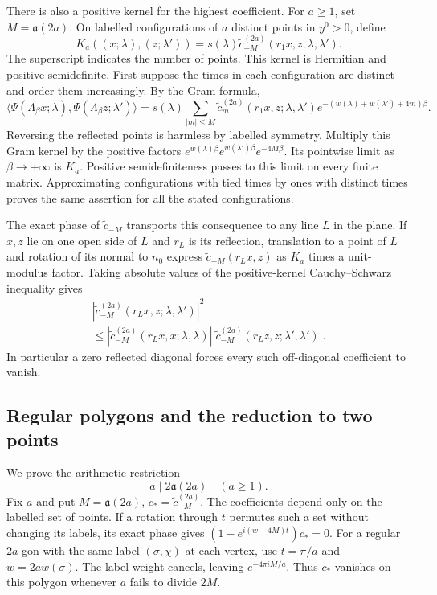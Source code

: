 There is also a positive kernel for the highest coefficient.
For $a\ge1$, set $M=\mathfrak a(2a)$. On labelled configurations
of $a$ distinct points in $y^0>0$, define
\begin{equation}\label{eq:rotation-top-coefficient-kernel}
 K_a((x;\lambda),(z;\lambda'))=
       s(\lambda)\widetilde c_{-M}^{(2a)}
                        (r_1x,z;\lambda,\lambda').
\end{equation}
The superscript indicates the number of points.
This kernel is Hermitian and positive semidefinite.
First suppose the times in each configuration are distinct and
order them increasingly. By the Gram formula,
\[
 \langle\Psi(\Lambda_\beta x;\lambda),
                 \Psi(\Lambda_\beta z;\lambda')\rangle
 =s(\lambda)\sum_{|m|\le M}
       \widetilde c_m^{(2a)}(r_1x,z;\lambda,\lambda')
       e^{-(w(\lambda)+w(\lambda')+4m)\beta}.
\]
Reversing the reflected points is harmless by labelled symmetry.
Multiply this Gram kernel by the positive factors
$e^{w(\lambda)\beta}e^{w(\lambda')\beta}e^{-4M\beta}$.
Its pointwise limit as $\beta\to+\infty$ is $K_a$.
Positive semidefiniteness passes to this limit on every finite
matrix. Approximating configurations with tied times by ones
with distinct times proves the same assertion for all the
stated configurations.

The exact phase of $\widetilde c_{-M}$ transports this consequence
to any line $L$ in the plane. If $x,z$ lie on one open side of
$L$ and $r_L$ is its reflection, translation to a point of $L$
and rotation of its normal to $n_0$ express
$\widetilde c_{-M}(r_Lx,z)$ as $K_a$ times a unit-modulus factor.
Taking absolute values of the positive-kernel
Cauchy--Schwarz inequality gives
\begin{multline}\label{eq:rotation-top-coefficient-CS}
 |\widetilde c_{-M}^{(2a)}(r_Lx,z;\lambda,\lambda')|^2\\
 \le
 |\widetilde c_{-M}^{(2a)}(r_Lx,x;\lambda,\lambda)|
 |\widetilde c_{-M}^{(2a)}(r_Lz,z;\lambda',\lambda')|.
\end{multline}
In particular a zero reflected diagonal forces every such
off-diagonal coefficient to vanish.

\subsection{Regular polygons and the reduction to two points}
\label{subsec:rotation-polygons}

We prove the arithmetic restriction
\begin{equation}\label{eq:rotation-polygon-divisibility}
 a\mid 2\mathfrak a(2a)\quad(a\ge1).
\end{equation}
Fix $a$ and put $M=\mathfrak a(2a)$,
$c_*=\widetilde c_{-M}^{(2a)}$.
The coefficients depend only on the labelled set of points.
If a rotation through $t$ permutes such a set without changing
its labels, its exact phase gives
$(1-e^{i(w-4M)t})c_*=0$.
For a regular $2a$-gon with the same label $(\sigma,\chi)$ at
each vertex, use $t=\pi/a$ and $w=2aw(\sigma)$.
The label weight cancels, leaving $e^{-4\pi iM/a}$.
Thus $c_*$ vanishes on this polygon whenever $a$ fails to divide $2M$.

